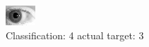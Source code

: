 \begin{figure}[h!]
\begin{center}
\includegraphics[width=0.60\columnwidth]{figures/ID302_class_4_target_3.png}
\end{center}
\caption{ Classification: 4 actual target: 3}
\label{fig:ID302_class_4_target_3}
\end{figure}
